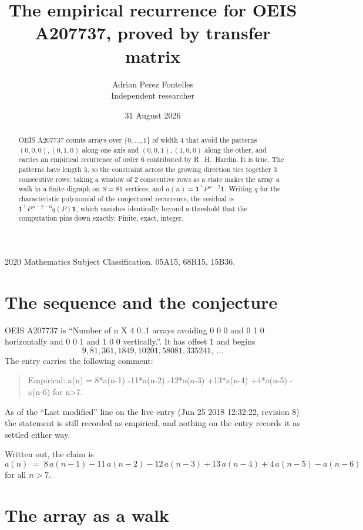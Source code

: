 \documentclass[11pt,a4paper]{article}
\title{The empirical recurrence for OEIS A207737, proved by transfer matrix}
\author{Adrian Perez Fontelles\\ \small Independent researcher}
\date{31 August 2026}
\theoremstyle{plain}
\theoremstyle{definition}
\begin{document}
\maketitle

\begin{abstract}
OEIS A207737 counts arrays over $\{0,\dots,1\}$ of width $4$ that avoid the patterns
$(0,0,0), (0,1,0)$ along one axis and $(0,0,1), (1,0,0)$ along the other, and carries an empirical recurrence of
order $6$ contributed by R.~H.~Hardin. It is true. The patterns have length $3$, so
the constraint across the growing direction ties together $3$ consecutive rows: taking a
window of $2$ consecutive rows as a state makes the array a walk in a finite digraph
on $S=81$ vertices, and $a(n)=\mathbf{1}^{\!\top}P^{\,n-2}\mathbf{1}$. Writing $q$
for the characteristic polynomial of the conjectured recurrence, the residual is
$\mathbf{1}^{\!\top}P^{\,n-2-6}q(P)\mathbf{1}$, which vanishes identically
beyond a threshold that the computation pins down exactly. Finite, exact, integer.
\end{abstract}

\noindent\small 2020 Mathematics Subject Classification. 05A15, 68R15, 15B36.\normalsize

\section{The sequence and the conjecture}

OEIS A207737 is ``Number of n X 4 0..1 arrays avoiding 0 0 0 and 0 1 0 horizontally and 0 0 1 and 1 0 0 vertically.''. It has offset
$1$ and begins
\[
9, 81, 361, 1849, 10201, 58081, 335241,\ \dots
\]
The entry carries the following comment:
\begin{quote}\small
Empirical: a(n) = 8*a(n-1) -11*a(n-2) -12*a(n-3) +13*a(n-4) +4*a(n-5) -a(n-6) for n>7.
\end{quote}
As of the ``Last modified'' line on the live entry (Jun 25 2018 12:32:22, revision
8) the statement is still recorded as empirical, and nothing on the entry
records it as settled either way.

Written out, the claim is
\begin{equation}\label{eq:conj}
a(n)\;=\;8\,a(n-1) - 11\,a(n-2) - 12\,a(n-3) + 13\,a(n-4) + 4\,a(n-5) - a(n-6)
\end{equation}
for all $n>7$. 

\section{The array as a walk}
\end{document}
